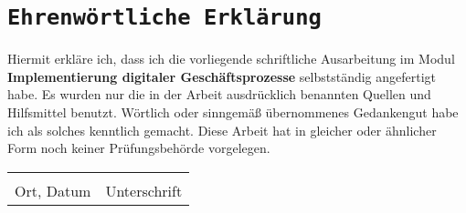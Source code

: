 \documentclass[a4paper,12pt]{article}
\begin{document}
\newpage

\newpage
{}
\section*{\texttt{Ehrenwörtliche Erklärung}}
Hiermit erkläre ich, dass ich die vorliegende schriftliche Ausarbeitung im Modul \textbf{Implementierung digitaler Geschäftsprozesse} selbstständig
angefertigt habe. Es wurden nur die in der Arbeit ausdrücklich benannten Quellen und
Hilfsmittel benutzt. Wörtlich oder sinngemäß übernommenes Gedankengut habe ich als
solches kenntlich gemacht. Diese Arbeit hat in gleicher oder ähnlicher Form noch keiner
Prüfungsbehörde vorgelegen.

\vspace{3cm}
\noindent\begin{tabular}{p{}p{}}
    \hrulefill & \hrulefill \\
    Ort, Datum & Unterschrift \\
\end{tabular}
\end{document}
